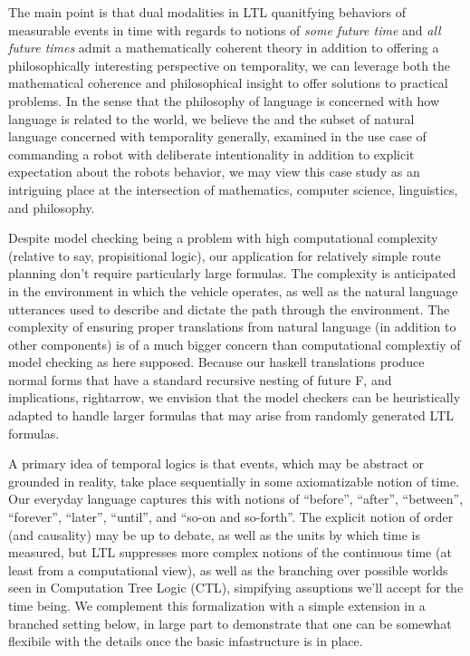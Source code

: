 \documentclass[a4paper, 11pt]{article}
\begin{document}
The main point is that dual modalities in LTL quanitfying behaviors of
measurable events in time with regards to notions of \emph{some future time} and
\emph{all future times} admit a mathematically coherent theory in addition to
offering a philosophically interesting perspective on temporality, we can
leverage both the mathematical coherence and philosophical insight to offer
solutions to practical problems. In the sense that the philosophy of language is
concerned with how language is related to the world, we believe the and the
subset of natural language concerned with temporality generally, examined in the
use case of commanding a robot with deliberate intentionality in addition to
explicit expectation about the robots behavior, we may view this case study as an
intriguing place at the intersection of mathematics, computer science,
linguistics, and philosophy.

Despite model checking being a problem with high computational complexity
(relative to say, propisitional logic), our application for relatively simple
route planning don't require particularly large formulas. The complexity is
anticipated in the environment in which the vehicle operates, as well as the
natural language utterances used to describe and dictate the path through the
environment. The complexity of ensuring proper translations from natural
language (in addition to other components) is of a much bigger concern than
computational complextiy of model checking as here supposed. Because our haskell
translations produce normal forms that have a standard recursive nesting of
future F, and implications, rightarrow, we envision that the model checkers can
be heuristically adapted to handle larger formulas that may arise from randomly
generated LTL formulas.

A primary idea of temporal logics is that events, which may be abstract or
grounded in reality, take place sequentially in some axiomatizable notion of
time. Our everyday language captures this with notions of ``before'', ``after'',
``between'', ``forever'', ``later'', ``until'', and ``so-on and so-forth''. The
explicit notion of order (and causality) may be up to debate, as well as the
units by which time is measured, but LTL suppresses more complex notions of the
continuous time (at least from a computational view), as well as the branching
over possible worlds seen in Computation Tree Logic (CTL), simpifying assuptions
we'll accept for the time being. We complement this formalization with a simple
extension in a branched setting below, in large part to demonstrate that one can
be somewhat flexibile with the details once the basic infastructure is in place.
\end{document}
